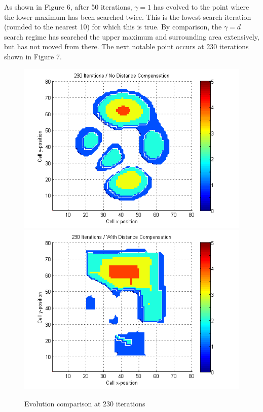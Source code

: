 \documentclass[a4paper]{article}
\begin{document}
As shown in Figure 6, after 50 iterations, $\gamma=1$ has evolved to the point where the lower maximum has been searched twice. This is the lowest search iteration (rounded to the nearest 10) for which this is true. By comparison, the $\gamma=d$ search regime has searched the upper maximum and surrounding area extensively, but has not moved from there. The next notable point occurs at 230 iterations shown in Figure 7.

\begin{figure}[H]\begin{center}
\includegraphics[scale=0.45]{../Matlab/Images/SearchCountNoDist230.png}
\includegraphics[scale=0.45]{../Matlab/Images/SearchCountDist230.png}
\caption{Evolution comparison at 230 iterations}
\end{center}\end{figure}
\end{document}
